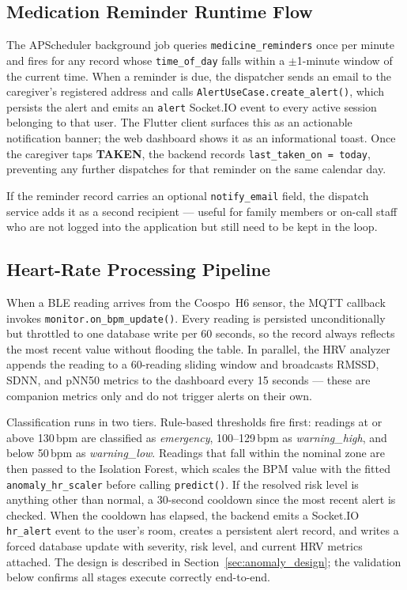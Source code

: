 \subsection{Medication Reminder Runtime Flow}

The APScheduler background job queries \texttt{medicine\_reminders} once per minute and fires for any record whose \texttt{time\_of\_day} falls within a $\pm$1-minute window of the current time. When a reminder is due, the dispatcher sends an email to the caregiver's registered address and calls \texttt{AlertUseCase.create\_alert()}, which persists the alert and emits an \texttt{alert} Socket.IO event to every active session belonging to that user. The Flutter client surfaces this as an actionable notification banner; the web dashboard shows it as an informational toast. Once the caregiver taps \textbf{TAKEN}, the backend records \texttt{last\_taken\_on = today}, preventing any further dispatches for that reminder on the same calendar day.

If the reminder record carries an optional \texttt{notify\_email} field, the dispatch service adds it as a second recipient --- useful for family members or on-call staff who are not logged into the application but still need to be kept in the loop.









\subsection{Heart-Rate Processing Pipeline}
\label{sec:hr_flow}

When a BLE reading arrives from the Coospo~H6 sensor, the MQTT callback invokes \texttt{monitor.on\_bpm\_update()}. Every reading is persisted unconditionally but throttled to one database write per 60 seconds, so the record always reflects the most recent value without flooding the table. In parallel, the HRV analyzer appends the reading to a 60-reading sliding window and broadcasts RMSSD, SDNN, and pNN50 metrics to the dashboard every 15 seconds --- these are companion metrics only and do not trigger alerts on their own.

Classification runs in two tiers. Rule-based thresholds fire first: readings at or above 130\,bpm are classified as \textit{emergency}, 100--129\,bpm as \textit{warning\_high}, and below 50\,bpm as \textit{warning\_low}. Readings that fall within the nominal zone are then passed to the Isolation Forest, which scales the BPM value with the fitted \texttt{anomaly\_hr\_scaler} before calling \texttt{predict()}. If the resolved risk level is anything other than normal, a 30-second cooldown since the most recent alert is checked. When the cooldown has elapsed, the backend emits a Socket.IO \texttt{hr\_alert} event to the user's room, creates a persistent alert record, and writes a forced database update with severity, risk level, and current HRV metrics attached. The design is described in Section~\ref{sec:anomaly_design}; the validation below confirms all stages execute correctly end-to-end.

